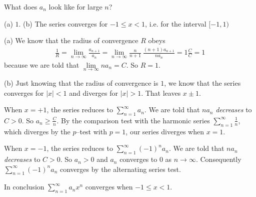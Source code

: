 \begin{hint}
What does $a_n$ look like for large $n$?
\end{hint}

\begin{answer}
(a) $1$.\qquad
(b) The series converges for $-1\le x<1$, i.e. for the interval $[-1,1)$
\end{answer}

\begin{solution}
(a) We know that the radius of convergence $R$ obeys
\begin{align*}
\frac{1}{R} = \lim_{n\rightarrow\infty}\frac{a_{n+1}}{a_n}
                     = \lim_{n\rightarrow\infty}\frac{n}{n+1}\ \frac{(n+1)a_{n+1}}{na_n}
                     = 1 \frac{C}{C}
                     = 1
\end{align*}
because we are told that $\lim\limits_{n\rightarrow\infty} na_n=C$. So $R=1$.

\noindent (b) Just knowing that the radius of convergence is $1$, we know that the
series converges for $|x|<1$ and diverges for $|x|>1$. That leaves $x\pm 1$.

\noindent When $x=+1$, the series reduces to $\sum\limits_{n=1}^\infty a_n $. We are told that
$na_n$ \emph{decreases} to $C>0$. So $a_n\ge \frac{C}{n}$. By the comparison test
with the harmonic series $\sum\limits_{n=1}^\infty\frac{1}{n}$, which diverges by the $p$--test
with $p=1$, our series diverges when $x=1$.

\noindent When $x=-1$, the series reduces to  $\sum\limits_{n=1}^\infty (-1)^n a_n $.
We are told that $na_n$ \emph{decreases} to $C>0$. So $a_n>0$ and $a_n$ converges to
$0$ as $n\rightarrow\infty$. Consequently $\sum\limits_{n=1}^\infty (-1)^n a_n $
converges by the alternating series test.

\noindent In conclusion  $\sum\limits_{n=1}^\infty a_n x^n$ converges when $-1\le x< 1$.
\end{solution}



